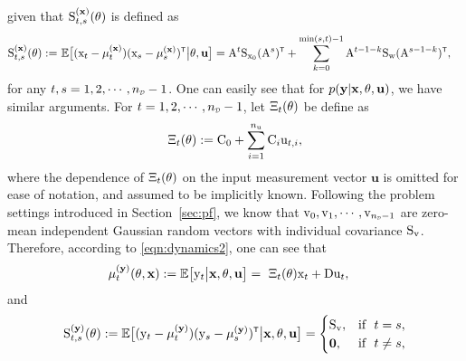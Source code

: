 given that ${ \mathrm{S} }^{(\mathbf{x})}_{t,s}({ \mathrm{\theta} })$ is defined as
\begin{equation}
    \begin{split}
        \mxS_{t,s}^{(\mathbf{x})}(\vctheta) 
        :=&\ 
        \mathbb{E}\big[(\vcx_t - \mu_t^{(\mathbf{x})})(\vcx_s - \mu_s^{(\mathbf{x})})^\tr\big| \vctheta, \mathbf{u}
        \big]
        =
        \mxA^t\mxS_{\vcx_0}(\mxA^s)^\tr + \sum_{k=0}^{\min(s,t) - 1}\mxA^{t-1-k}\mxS_\vcw(\mxA^{s-1-k})^\tr,
    \end{split}
\end{equation}
for any $t,s = 1,2,\cdots, \nD-1$. 
One can easily see that for $p(\mathbf{y}|\mathbf{x},{ \mathrm{\theta} }, \mathbf{u})$, we have similar arguments. For $t = 1,2,\cdots, \nD-1$, let $\Xi_t({ \mathrm{\theta} })$ be define as
\begin{equation}\label{eqn:Xi_t}
    \Xi_t({ \mathrm{\theta} }) := {{ \mathrm{C} }}_0 + \sum_{i=1}^{n_{ \mathrm{u} }} {{ \mathrm{C} }}_i { \mathrm{u} }_{t,i},
\end{equation}
where the dependence of $\Xi_t({ \mathrm{\theta} })$ on the input measurement vector $\mathbf{u}$ is omitted for ease of notation, and assumed to be implicitly known. 
Following the problem settings introduced in Section~\ref{sec:pf}, we know that $\vcv_0, \vcv_1, \cdots, \vcv_{\nsD-1}$ are zero-mean independent Gaussian random vectors with individual covariance ${ \mathrm{S} }_{ \mathrm{v} }$.
Therefore, according to \eqref{eqn:dynamics2}, one can see that
\begin{equation}
\begin{split}
    \mu_t^{(\mathbf{y})}(\vctheta,\mathbf{x}) 
    :=
    \Exp
    \big[
    \vcy_t 
    \big| 
    \mathbf{x}, \vctheta, \mathbf{u}
    \big]
     &=\ 
     \Xi_t(\vctheta) \vcx_t + \mxD \vcu_t,
\end{split}
\end{equation}
and
\begin{equation}
\begin{split}
    \mxS_{t,s}^{(\mathbf{y})}({\vctheta}) 
    :=
    \Exp
    \big[
    (\vcy_t - \mu_t^{(\mathbf{y})})(\vcy_s - \mu_s^{(\mathbf{y})})^\tr 
    \big| 
    \mathbf{x}, \vctheta, \mathbf{u}
    \big] 
    = 
    \begin{cases}
        \mxS_\vcv, & \text{if }\  t = s,\\
        \mathbf{0}, & \text{if }\  t \ne s,\\
    \end{cases}
\end{split}
\end{equation}
